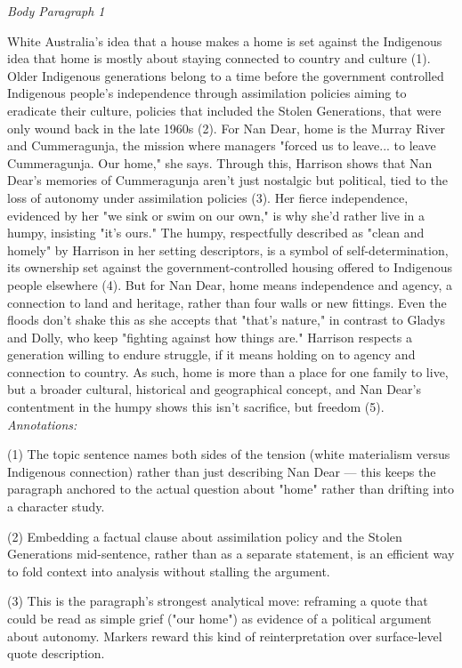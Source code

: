 \documentclass[a4paper]{article}
\begin{document}
\textit{Body Paragraph 1}

White Australia's idea that a house makes a home is set against the Indigenous idea that home is mostly about staying connected to country and culture (1). Older Indigenous generations belong to a time before the government controlled Indigenous people's independence through assimilation policies aiming to eradicate their culture, policies that included the Stolen Generations, that were only wound back in the late 1960s (2). For Nan Dear, home is the Murray River and Cummeragunja, the mission where managers "forced us to leave... to leave Cummeragunja. Our home," she says. Through this, Harrison shows that Nan Dear's memories of Cummeragunja aren't just nostalgic but political, tied to the loss of autonomy under assimilation policies (3). Her fierce independence, evidenced by her "we sink or swim on our own," is why she'd rather live in a humpy, insisting "it's ours." The humpy, respectfully described as "clean and homely" by Harrison in her setting descriptors, is a symbol of self-determination, its ownership set against the government-controlled housing offered to Indigenous people elsewhere (4). But for Nan Dear, home means independence and agency, a connection to land and heritage, rather than four walls or new fittings. Even the floods don't shake this as she accepts that "that's nature," in contrast to Gladys and Dolly, who keep "fighting against how things are." Harrison respects a generation willing to endure struggle, if it means holding on to agency and connection to country. As such, home is more than a place for one family to live, but a broader cultural, historical and geographical concept, and Nan Dear's contentment in the humpy shows this isn't sacrifice, but freedom (5).\\

\textit{Annotations:}

(1) The topic sentence names both sides of the tension (white materialism versus Indigenous connection) rather than just describing Nan Dear — this keeps the paragraph anchored to the actual question about "home" rather than drifting into a character study.

(2) Embedding a factual clause about assimilation policy and the Stolen Generations mid-sentence, rather than as a separate statement, is an efficient way to fold context into analysis without stalling the argument.

(3) This is the paragraph's strongest analytical move: reframing a quote that could be read as simple grief ("our home") as evidence of a political argument about autonomy. Markers reward this kind of reinterpretation over surface-level quote description.
\end{document}
